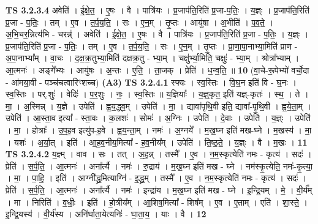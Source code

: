 \documentclass[17pt]{extarticle}
\begin{document}
                  \newline
                                \textbf{ TS 3.2.3.4} \newline
                  अवेति॑ । ई॒क्षे॒त॒ । ए॒षः । वै । पात्रि॑यः । प्र॒जाप॑ति॒रिति॑ प्र॒जा-प॒तिः॒ । य॒ज्ञ्ः । प्र॒जाप॑ति॒रिति॑ प्र॒जा - प॒तिः॒ । तम् । ए॒व । त॒र्प॒य॒ति॒ । सः । ए॒न॒म् । तृ॒प्तः । आयु॑षा । अ॒भीति॑ । प॒व॒ते॒ । अ॒भि॒चर॒न्नित्य॑भि - चरन्न्॑ । अवेति॑ । ई॒क्षे॒त॒ । ए॒षः । वै । पात्रि॑यः । प्र॒जाप॑ति॒रिति॑ प्र॒जा - प॒तिः॒ । य॒ज्ञ्ः । प्र॒जाप॑ति॒रिति॑ प्र॒जा - प॒तिः॒ । तम् । ए॒व । त॒र्प॒य॒ति॒ । सः । ए॒न॒म् । तृ॒प्तः । प्रा॒णा॒पा॒नाभ्या॒मिति॑ प्राण - अ॒पा॒नाभ्या᳚म् । वा॒चः । द॒क्ष॒क्र॒तुभ्या॒मिति॑ दक्षक्र॒तु - भ्या॒म् । चक्षु॑र्भ्या॒मिति॒ चक्षुः॑ - भ्या॒म् । श्रोत्रा᳚भ्याम् । आ॒त्मनः॑ । अङ्गे᳚भ्यः । आयु॑षः । अ॒न्तः । ए॒ति॒ । ता॒जक् । प्रेति॑ । ध॒न्व॒ति॒ ॥ \textbf{  10} \newline
                  \newline
                      (वा॒चे-रू॒पेभ्यो॑ वर्चो॒दा - आ॑मया॒वी - पञ्च॑चत्वारिꣳशच्च)  \textbf{(A3)} \newline \newline
                                \textbf{ TS 3.2.4.1} \newline
                  स्फ्यः । स्व॒स्तिः । वि॒घ॒न इति॑ वि - घ॒नः । स्व॒स्तिः । पर्.शुः॑ । वेदिः॑ । प॒र॒शुः । नः॒ । स्व॒स्तिः ॥ य॒ज्ञियाः᳚ । य॒ज्ञ्॒कृत॒ इति॑ यज्ञ्-कृतः॑ । स्थ॒ । ते । मा॒ । अ॒स्मिन्न् । य॒ज्ञे । उपेति॑ । ह्व॒य॒द्ध्व॒म् । उपेति॑ । मा॒ । द्यावा॑पृथि॒वी इति॒ द्यावा᳚-पृ॒थि॒वी । ह्व॒ये॒ता॒म् । उपेति॑ । आ॒स्ता॒व इत्या᳚ - स्ता॒वः । क॒लशः॑ । सोमः॑ । अ॒ग्निः । उपेति॑ । दे॒वाः । उपेति॑ । य॒ज्ञ्ः । उपेति॑ । मा॒ । होत्राः᳚ । उ॒प॒ह॒व इत्यु॑प-ह॒वे । ह्व॒य॒न्ता॒म् । नमः॑ । अ॒ग्नये᳚ । म॒ख॒घ्न इति॑ मख-घ्ने । म॒खस्य॑ । मा॒ । यशः॑ । अ॒र्या॒त् । इति॑ । आ॒ह॒व॒नीय॒मित्या᳚ - ह॒व॒नीय᳚म् । उपेति॑ । ति॒ष्ठ॒ते॒ । य॒ज्ञ्ः । वै । म॒खः । \textbf{  11} \newline
                  \newline
                                \textbf{ TS 3.2.4.2} \newline
                  य॒ज्ञ्म् । वाव । सः । तत् । अ॒ह॒न्न् । तस्मै᳚ । ए॒व । न॒म॒स्कृत्येति॑ नमः - कृत्य॑ । सदः॑ । प्रेति॑ । स॒र्प॒ति॒ । आ॒त्मनः॑ । अना᳚र्त्यै । नमः॑ । रु॒द्राय॑ । म॒ख॒घ्न इति॑ मख - घ्ने । नम॑स्कृ॒त्येति॒ नमः॑-कृ॒त्या॒ । मा॒ । पा॒हि॒ । इति॑ । आग्नी᳚द्ध्र॒मित्याग्नि॑ - इ॒द्ध्र॒म् । तस्मै᳚ । ए॒व । न॒म॒स्कृत्येति॑ नमः - कृत्य॑ । सदः॑ । प्रेति॑ । स॒र्प॒ति॒ । आ॒त्मनः॑ । अना᳚र्त्यै । नमः॑ । इन्द्रा॑य । म॒ख॒घ्न इति॑ मख - घ्ने । इ॒न्द्रि॒यम् । मे॒ । वी॒र्य᳚म् । मा । निरिति॑ । व॒धीः॒ । इति॑ । हो॒त्रीय᳚म् । आ॒शिष॒मित्या᳚ - शिष᳚म् । ए॒व । ए॒ताम् । एति॑ । शा॒स्ते॒ । इ॒न्द्रि॒यस्य॑ । वी॒र्य॑स्य । अनि॑र्घाता॒येत्यनिः॑ - घा॒ता॒य॒ । याः । वै । \textbf{  12} \newline
\end{document}
